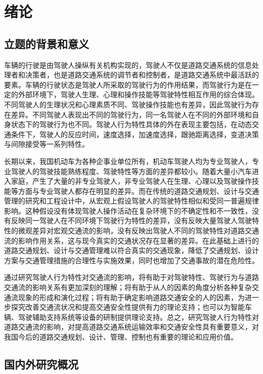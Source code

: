 \chapter{绪论}
\section{立题的背景和意义}

车辆的行驶是由驾驶人操纵有关机构实现的，驾驶人不仅是道路交通系统的信息处理者和决策者，也是道路交通系统的调节者和控制者，是道路交通系统中最活跃的要素。车辆的行驶状态是驾驶人所采取的驾驶行为的作用结果，而驾驶行为是在一定的外部环境下，驾驶人生理、心理和操作技能等驾驶特性相互作用的综合体现。不同驾驶人的生理状况和心理素质不同、驾驶操作技能也有差异，因此驾驶行为存在差异。不同驾驶人表现出不同的驾驶行为，同一名驾驶人在不同的外部环境和自身状态下的驾驶行为也不同。驾驶人行为特性具体的外在表现主要包括，在动态交通条件下，驾驶人的反应时间，速度选择，加速度选择，跟驰距离选择，变道决策与间隙接受等一系列特性。

长期以来，我国机动车为各种企事业单位所有，机动车驾驶人均为专业驾驶人，专业驾驶人的驾驶技能熟练程度、驾驶特性等方面的差异都较小。随着大量小汽车进入家庭，产生了大量的非专业驾驶人，非专业驾驶人在生理、心理以及驾驶操作技能等方面与专业驾驶人都存在明显的差异。而在传统的道路交通规划、设计与交通管理的研究和工程设计中，从宏观上假设驾驶人的驾驶特性相似和受同一普遍规律影响。这种假设没有体现驾驶人操作活动在复杂环境下的不确定性和不一致性，没有反映同一驾驶人在不同环境下驾驶行为特性的差异，没有反映大量驾驶人驾驶特性的微观差异对宏观交通流的影响，没有反映出驾驶人不同的驾驶特性对道路交通流的影响作用关系，这与现今真实的交通状况存在显著的差异。在此基础上进行的道路交通规划、设计与交通管理难以符合真实的交通现象，降低了交通规划、设计方案与交通管理措施的合理性与实施效果，同时也增加了交通事故的潜在危险性。

通过研究驾驶人行为特性对交通流的影响，将有助于对驾驶特性、驾驶行为与道路交通流的影响关系有更加深刻的理解；将有助于从人的因素的角度分析各种复杂交通流现象的形成和演化过程；将有助于确定影响道路交通安全的人的因素，为进一步探究改善交通流状况和提高交通安全性提供有力的理论支持；也可以为智能车辆、驾驶辅助支持系统等设备的研制提供理论支持。总之，研究驾驶人行为特性对道路交通流的影响，对提高道路交通系统运输效率和交通安全性具有重要意义，对我国今后的道路交通规划、设计、管理、控制也有重要的理论和应用价值。



\section{国内外研究概况}


